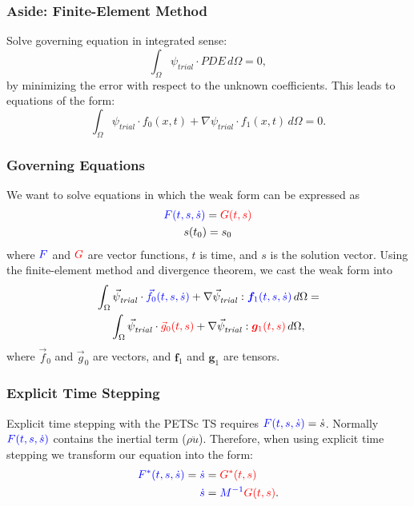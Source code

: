 \documentclass[aspectratio=169,hyperref=colorlinks]{beamer}
\newcommand{\lhs}[1]{{\color{blue}#1}}
\newcommand{\rhs}[1]{{\color{red}#1}}
\newcommand{\trialvec}[1][]{{\vec{\psi}_\mathit{trial}^{#1}}}
\newcommand{\trialscalar}[1][]{{\psi_\mathit{trial}^{#1}}}
\newcommand{\tensor}[1]{\bm{#1}}
\begin{document}
\begin{frame}
  \frametitle{Aside: Finite-Element Method}

  Solve governing equation in integrated sense:
  \begin{equation}
    \int_\Omega \trialscalar \cdot \mathit{PDE} \, d\Omega = 0,
  \end{equation}
  by minimizing the error with respect to the unknown coefficients.
  \vfill
  This leads to equations of the form:
  \begin{equation}
    \int_\Omega \trialscalar \cdot f_0(x,t) + \nabla \trialscalar \cdot f_1(x,t) \, d\Omega = 0.
  \end{equation}

\end{frame}

\begin{frame}
  \frametitle{Governing Equations}
  \summary{}

  We want to solve equations in which the weak form can be expressed
  as
  \begin{gather}
    \lhs{F(t,s,\dot{s})} = \rhs{G(t,s)} \\
    s(t_0) = s_0
  \end{gather}
  where $\lhs{F}$ and $\rhs{G}$ are vector functions, $t$ is time, and $s$ is the solution vector.
  \vfill
  Using the finite-element method and divergence theorem, we cast the weak form into
  \begin{multline}
    \int_\Omega \trialvec \cdot \lhs{\vec{f}_0(t,s,\dot{s})} + \nabla \trialvec : \lhs{\tensor{f}
    _1(t,s,\dot{s})} \, 
    d\Omega = \\
    \int_\Omega \trialvec \cdot \rhs{\vec{g}_0(t,s)} + \nabla \trialvec : \rhs{\tensor{g}_1(t,s)} \, 
    d\Omega,
  \end{multline}
  where $\vec{f}_0$ and $\vec{g}_0$ are vectors, and $\tensor{f}_1$ and
  $\tensor{g}_1$ are tensors.

\end{frame}

\begin{frame}
  \frametitle{Explicit Time Stepping}
  \summary{}

  Explicit time stepping with the PETSc TS requires $\lhs{F(t,s,\dot{s})} = \dot{s}$.
  \vfill
  Normally $\lhs{F(t,s,\dot{s})}$ contains the inertial term ($\rho \ddot{u}$).
  \vfill
  Therefore, when using explicit time stepping we transform our equation into the form:
  \begin{align}
    \lhs{F^*(t,s,\dot{s})} = \lhs{\dot{s}} &= \rhs{G^*(t,s)} \\
    \lhs{\dot{s}} &= \lhs{M^{-1}}\rhs{G(t,s)}.
  \end{align}  

\end{frame}
\end{document}
